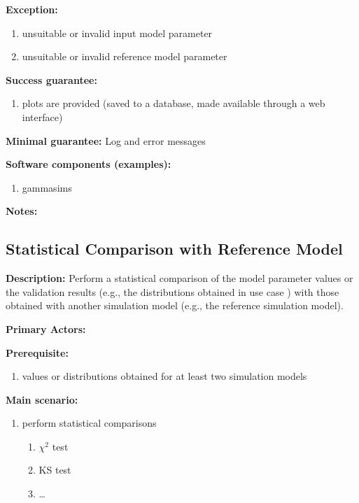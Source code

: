 \textbf{Exception:}
\begin{enumerate}
    \item unsuitable or invalid input model parameter
    \item unsuitable or invalid reference model parameter
\end{enumerate}

\textbf{Success guarantee:}
\begin{enumerate}
    \item plots are provided (saved to a database, made available through a web interface)
\end{enumerate}

\textbf{Minimal guarantee:}
Log and error messages

\textbf{Software components (examples):}
\begin{enumerate}
    \item gammasims
\end{enumerate}

\textbf{Notes:}


\subsection{Statistical Comparison with Reference Model}
\label{validation:StatisticalComparisonwithReferenceModel}
\textbf{Description:}
Perform a statistical comparison of the model parameter values or the validation results (e.g., the distributions obtained in use case ) with those obtained with another simulation model (e.g., the reference simulation model).

\textbf{Primary Actors:}

\textbf{Prerequisite:}

\begin{enumerate}
    \item values or distributions obtained for at least two simulation models 
\end{enumerate}

\textbf{Main scenario:}

\begin{enumerate}
    \item perform statistical comparisons
    \begin{enumerate}
        \item $\chi^2$ test
        \item KS test
        \item \dots
    \end{enumerate}
\end{enumerate}

